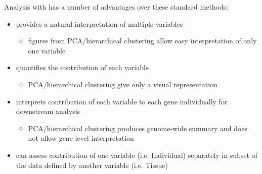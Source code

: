 \documentclass[12pt]{article}\usepackage[]{graphicx}\usepackage[]{xcolor}
\begin{document}
Analysis with  has a number of advantages over these standard methods: 
\begin{itemize}
  \item {} provides a natural interpretation of multiple variables
    \begin{itemize}
     \item figures from PCA/hierarchical clustering allow easy interpretation of only one variable
    \end{itemize}
  \vspace{.1in}
  \item {} quantifies the contribution of each variable
    \begin{itemize}
      \item PCA/hierarchical clustering give only a visual representation
    \end{itemize}
  \vspace{.1in}
  \item {} interprets contribution of each variable to each gene individually for downstream analysis
    \begin{itemize}
     \item PCA/hierarchical clustering produces genome-wide summary and does not allow gene-level interpretation
    \end{itemize} \vspace{2mm}
  \item {} can assess contribution of one variable (i.e. Individual) separately in subset of the data defined by another variable (i.e. Tissue)
\end{itemize}
\end{document}
